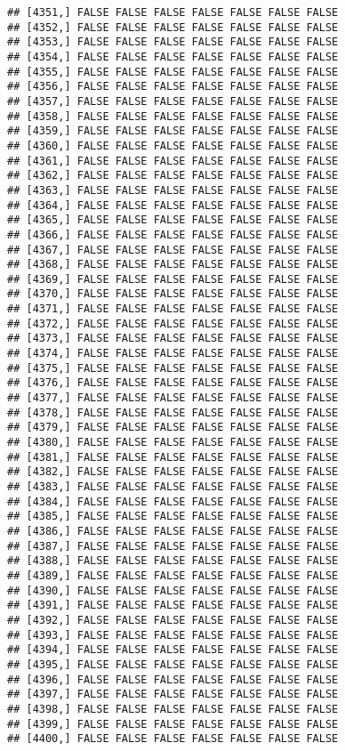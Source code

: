 \documentclass[
]{article}
\begin{document}
\begin{verbatim}
## [4351,] FALSE FALSE FALSE FALSE FALSE FALSE FALSE
## [4352,] FALSE FALSE FALSE FALSE FALSE FALSE FALSE
## [4353,] FALSE FALSE FALSE FALSE FALSE FALSE FALSE
## [4354,] FALSE FALSE FALSE FALSE FALSE FALSE FALSE
## [4355,] FALSE FALSE FALSE FALSE FALSE FALSE FALSE
## [4356,] FALSE FALSE FALSE FALSE FALSE FALSE FALSE
## [4357,] FALSE FALSE FALSE FALSE FALSE FALSE FALSE
## [4358,] FALSE FALSE FALSE FALSE FALSE FALSE FALSE
## [4359,] FALSE FALSE FALSE FALSE FALSE FALSE FALSE
## [4360,] FALSE FALSE FALSE FALSE FALSE FALSE FALSE
## [4361,] FALSE FALSE FALSE FALSE FALSE FALSE FALSE
## [4362,] FALSE FALSE FALSE FALSE FALSE FALSE FALSE
## [4363,] FALSE FALSE FALSE FALSE FALSE FALSE FALSE
## [4364,] FALSE FALSE FALSE FALSE FALSE FALSE FALSE
## [4365,] FALSE FALSE FALSE FALSE FALSE FALSE FALSE
## [4366,] FALSE FALSE FALSE FALSE FALSE FALSE FALSE
## [4367,] FALSE FALSE FALSE FALSE FALSE FALSE FALSE
## [4368,] FALSE FALSE FALSE FALSE FALSE FALSE FALSE
## [4369,] FALSE FALSE FALSE FALSE FALSE FALSE FALSE
## [4370,] FALSE FALSE FALSE FALSE FALSE FALSE FALSE
## [4371,] FALSE FALSE FALSE FALSE FALSE FALSE FALSE
## [4372,] FALSE FALSE FALSE FALSE FALSE FALSE FALSE
## [4373,] FALSE FALSE FALSE FALSE FALSE FALSE FALSE
## [4374,] FALSE FALSE FALSE FALSE FALSE FALSE FALSE
## [4375,] FALSE FALSE FALSE FALSE FALSE FALSE FALSE
## [4376,] FALSE FALSE FALSE FALSE FALSE FALSE FALSE
## [4377,] FALSE FALSE FALSE FALSE FALSE FALSE FALSE
## [4378,] FALSE FALSE FALSE FALSE FALSE FALSE FALSE
## [4379,] FALSE FALSE FALSE FALSE FALSE FALSE FALSE
## [4380,] FALSE FALSE FALSE FALSE FALSE FALSE FALSE
## [4381,] FALSE FALSE FALSE FALSE FALSE FALSE FALSE
## [4382,] FALSE FALSE FALSE FALSE FALSE FALSE FALSE
## [4383,] FALSE FALSE FALSE FALSE FALSE FALSE FALSE
## [4384,] FALSE FALSE FALSE FALSE FALSE FALSE FALSE
## [4385,] FALSE FALSE FALSE FALSE FALSE FALSE FALSE
## [4386,] FALSE FALSE FALSE FALSE FALSE FALSE FALSE
## [4387,] FALSE FALSE FALSE FALSE FALSE FALSE FALSE
## [4388,] FALSE FALSE FALSE FALSE FALSE FALSE FALSE
## [4389,] FALSE FALSE FALSE FALSE FALSE FALSE FALSE
## [4390,] FALSE FALSE FALSE FALSE FALSE FALSE FALSE
## [4391,] FALSE FALSE FALSE FALSE FALSE FALSE FALSE
## [4392,] FALSE FALSE FALSE FALSE FALSE FALSE FALSE
## [4393,] FALSE FALSE FALSE FALSE FALSE FALSE FALSE
## [4394,] FALSE FALSE FALSE FALSE FALSE FALSE FALSE
## [4395,] FALSE FALSE FALSE FALSE FALSE FALSE FALSE
## [4396,] FALSE FALSE FALSE FALSE FALSE FALSE FALSE
## [4397,] FALSE FALSE FALSE FALSE FALSE FALSE FALSE
## [4398,] FALSE FALSE FALSE FALSE FALSE FALSE FALSE
## [4399,] FALSE FALSE FALSE FALSE FALSE FALSE FALSE
## [4400,] FALSE FALSE FALSE FALSE FALSE FALSE FALSE

\end{verbatim}
\end{document}
